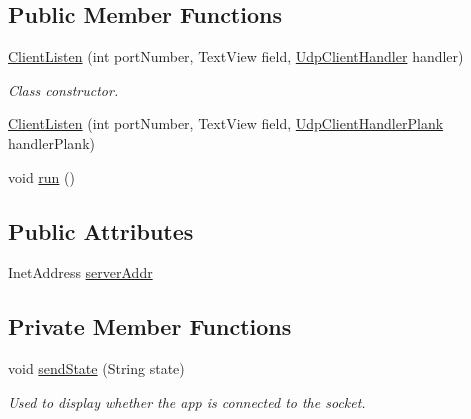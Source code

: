 \subsection*{Public Member Functions}
\begin{DoxyCompactItemize}
\item 
\mbox{\hyperlink{classcom_1_1example_1_1trainawearapplication_1_1_client_listen_a24ac2c031ded11c7a5ce64dae1694253}{Client\+Listen}} (int port\+Number, Text\+View field, \mbox{\hyperlink{classcom_1_1example_1_1trainawearapplication_1_1_udp_client_handler}{Udp\+Client\+Handler}} handler)
\begin{DoxyCompactList}\small\item\em Class constructor. \end{DoxyCompactList}\item 
\mbox{\hyperlink{classcom_1_1example_1_1trainawearapplication_1_1_client_listen_ae0a26fe4b938f8a52e10e6f43665e23c}{Client\+Listen}} (int port\+Number, Text\+View field, \mbox{\hyperlink{classcom_1_1example_1_1trainawearapplication_1_1_udp_client_handler_plank}{Udp\+Client\+Handler\+Plank}} handler\+Plank)
\item 
void \mbox{\hyperlink{classcom_1_1example_1_1trainawearapplication_1_1_client_listen_adcb69d9825d6d9e182905cf9b4aa4d7d}{run}} ()
\end{DoxyCompactItemize}
\subsection*{Public Attributes}
\begin{DoxyCompactItemize}
\item 
Inet\+Address \mbox{\hyperlink{classcom_1_1example_1_1trainawearapplication_1_1_client_listen_abc9e0b9f60e38782a9aa64dde9b43273}{server\+Addr}}
\end{DoxyCompactItemize}
\subsection*{Private Member Functions}
\begin{DoxyCompactItemize}
\item 
void \mbox{\hyperlink{classcom_1_1example_1_1trainawearapplication_1_1_client_listen_ab1d26a5c46561734eef258d64a6d7723}{send\+State}} (String state)
\begin{DoxyCompactList}\small\item\em Used to display whether the app is connected to the socket. \end{DoxyCompactList}\end{DoxyCompactItemize}

